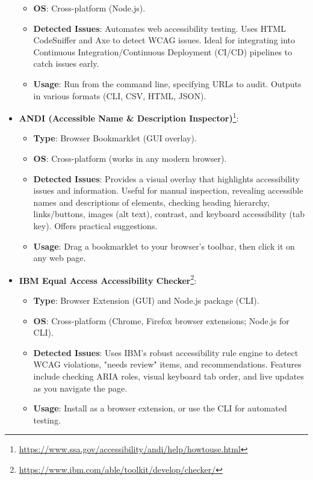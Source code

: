 \begin{itemize}
\begin{itemize}
            \item \textbf{OS}: Cross-platform (Node.js).
            \item \textbf{Detected Issues}: Automates web accessibility testing. Uses HTML CodeSniffer and Axe to detect WCAG issues. Ideal for integrating into Continuous Integration/Continuous Deployment (CI/CD) pipelines to catch issues early.
            \item \textbf{Usage}: Run from the command line, specifying URLs to audit. Outputs in various formats (CLI, CSV, HTML, JSON).
        \end{itemize}
    \item \textbf{ANDI (Accessible Name & Description Inspector)}\footnote{\url{https://www.ssa.gov/accessibility/andi/help/howtouse.html}}:
        \begin{itemize}
            \item \textbf{Type}: Browser Bookmarklet (GUI overlay).
            \item \textbf{OS}: Cross-platform (works in any modern browser).
            \item \textbf{Detected Issues}: Provides a visual overlay that highlights accessibility issues and information. Useful for manual inspection, revealing accessible names and descriptions of elements, checking heading hierarchy, links/buttons, images (alt text), contrast, and keyboard accessibility (tab key). Offers practical suggestions.
            \item \textbf{Usage}: Drag a bookmarklet to your browser's toolbar, then click it on any web page.
        \end{itemize}
    \item \textbf{IBM Equal Access Accessibility Checker}\footnote{\url{https://www.ibm.com/able/toolkit/develop/checker/}}:
        \begin{itemize}
            \item \textbf{Type}: Browser Extension (GUI) and Node.js package (CLI).
            \item \textbf{OS}: Cross-platform (Chrome, Firefox browser extensions; Node.js for CLI).
            \item \textbf{Detected Issues}: Uses IBM's robust accessibility rule engine to detect WCAG violations, "needs review" items, and recommendations. Features include checking ARIA roles, visual keyboard tab order, and live updates as you navigate the page.
            \item \textbf{Usage}: Install as a browser extension, or use the CLI for automated testing.
        \end{itemize}
\end{itemize}

